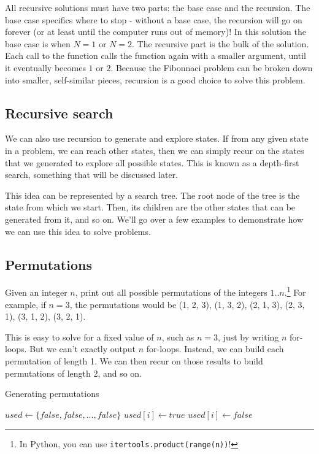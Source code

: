 All recursive solutions must have two parts: the base case and the recursion.  The base case specifics where to stop - without a base case, the recursion will go on forever (or at least until the computer runs out of memory)!  In this solution the base case is when $ N = 1 $ or $ N = 2 $.  The recursive part is the bulk of the solution.  Each call to the function calls the function again with a smaller argument, until it eventually becomes $ 1 $ or $ 2 $.  Because the Fibonnaci problem can be broken down into smaller, self-similar pieces, recursion is a good choice to solve this problem.


\subsection{Recursive search}
We can also use recursion to generate and explore states. If from any given state in a problem, we can reach other states, then we can simply recur on the states that we generated to explore all possible states. This is known as a depth-first search, something that will be discussed later.

This idea can be represented by a search tree. The root node of the tree is the state from which we start. Then, its children are the other states that can be generated from it, and so on. We'll go over a few examples to demonstrate how we can use this idea to solve problems.


\subsection{Permutations}

\begin{Problem}
Given an integer $n$, print out all possible permutations of the integers $1..n$.\footnote{In Python, you can use \texttt{itertools.product(range(n))}!} For example, if $n=3$, the permutations would be (1, 2, 3), (1, 3, 2), (2, 1, 3), (2, 3, 1), (3, 1, 2), (3, 2, 1).
\end{Problem}

\noindent This is easy to solve for a fixed value of $n$, such as $n=3$, just by writing $n$ for-loops. But we can't exactly output $n$ for-loops. Instead, we can build each permutation of length 1. We can then recur on those results to build permutations of length 2, and so on.



\begin{algorithm}[H]
\caption{Generating permutations}
\begin{algorithmic}

\State $used \gets \{false, false, \ldots, false\}$
        \State {}
        \State \Return
    \EndIf
            \State $used[i] \gets true$
            \State {}
            \State $used[i] \gets false$
        \EndIf
    \EndFor
\EndFunction

\end{algorithmic}
\end{algorithm}



